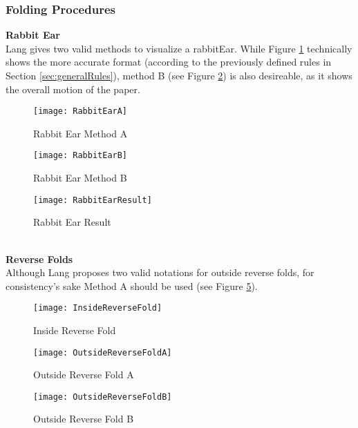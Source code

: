 \newpage
\subsubsection{Folding Procedures}
\textbf{Rabbit Ear}\\
Lang gives two valid methods to visualize a \gls{rabbitEar}. While Figure \ref{fig:rabbitEarA} technically shows the more accurate format (according to the previously defined rules in Section \ref{sec:generalRules}), method B (see Figure \ref{fig:rabbitEarB}) is also desireable, as it shows the overall motion of the paper.
\begin{figure*}[h]
    \centering
    \begin{subfigure}[b]{0.4\textwidth}
        \texttt{[image: RabbitEarA]}
        \caption{Rabbit Ear Method A}
        \label{fig:rabbitEarA}
    \end{subfigure}
    \begin{subfigure}[b]{0.52\textwidth}
        \texttt{[image: RabbitEarB]}
        \caption{Rabbit Ear Method B}
        \label{fig:rabbitEarB}
    \end{subfigure}
    \caption{Both methods show a rabbit ear fold}
    \label{fig:rabbitEarMethods}
\end{figure*}
\begin{figure}[h]
	\centering
	\texttt{[image: RabbitEarResult]}
	\caption{Rabbit Ear Result}
	\label{fig:rabbitEarResult}
\end{figure}\\
\newpage
\textbf{Reverse Folds}\\
Although Lang proposes two valid notations for outside reverse folds, for consistency's sake Method A should be used (see Figure \ref{fig:outsideReverseFoldA}).

\begin{figure*}[h]
	\centering
	\begin{subfigure}[b]{0.3\textwidth}
		\texttt{[image: InsideReverseFold]}
		\caption{Inside Reverse Fold}
		\label{fig:insideReverseFold}
	\end{subfigure}
	\begin{subfigure}[b]{0.3\textwidth}
		\texttt{[image: OutsideReverseFoldA]}
		\caption{Outside Reverse Fold A}
		\label{fig:outsideReverseFoldA}
	\end{subfigure}
	\begin{subfigure}[b]{0.3\textwidth}
		\texttt{[image: OutsideReverseFoldB]}
		\caption{Outside Reverse Fold B}
		\label{fig:outsideReverseFoldB}
	\end{subfigure}
	\caption{Different reverse folds}
	\label{fig:reverseFoldMethods}
\end{figure*}

